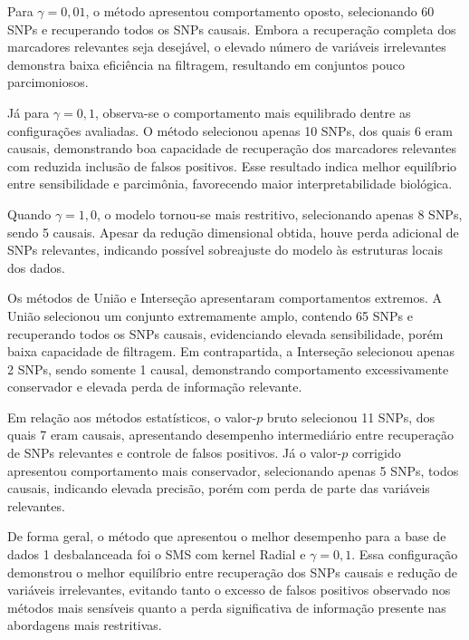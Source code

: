 \documentclass[
    12pt,
    a4paper,
    oneside,
    english,
    french,
    spanish,
    brazil
    ]{abntex2}
\begin{document}
Para $\gamma = 0{,}01$, o método apresentou comportamento oposto, selecionando 60 SNPs e recuperando todos os SNPs causais. Embora a recuperação completa dos marcadores relevantes seja desejável, o elevado número de variáveis irrelevantes demonstra baixa eficiência na filtragem, resultando em conjuntos pouco parcimoniosos.

Já para $\gamma = 0{,}1$, observa-se o comportamento mais equilibrado dentre as configurações avaliadas. O método selecionou apenas 10 SNPs, dos quais 6 eram causais, demonstrando boa capacidade de recuperação dos marcadores relevantes com reduzida inclusão de falsos positivos. Esse resultado indica melhor equilíbrio entre sensibilidade e parcimônia, favorecendo maior interpretabilidade biológica.

Quando $\gamma = 1{,}0$, o modelo tornou-se mais restritivo, selecionando apenas 8 SNPs, sendo 5 causais. Apesar da redução dimensional obtida, houve perda adicional de SNPs relevantes, indicando possível sobreajuste do modelo às estruturas locais dos dados.

Os métodos de União e Interseção apresentaram comportamentos extremos. A União selecionou um conjunto extremamente amplo, contendo 65 SNPs e recuperando todos os SNPs causais, evidenciando elevada sensibilidade, porém baixa capacidade de filtragem. Em contrapartida, a Interseção selecionou apenas 2 SNPs, sendo somente 1 causal, demonstrando comportamento excessivamente conservador e elevada perda de informação relevante.

Em relação aos métodos estatísticos, o valor-$p$ bruto selecionou 11 SNPs, dos quais 7 eram causais, apresentando desempenho intermediário entre recuperação de SNPs relevantes e controle de falsos positivos. Já o valor-$p$ corrigido apresentou comportamento mais conservador, selecionando apenas 5 SNPs, todos causais, indicando elevada precisão, porém com perda de parte das variáveis relevantes.

De forma geral, o método que apresentou o melhor desempenho para a base de dados 1 desbalanceada foi o SMS com kernel Radial e $\gamma = 0{,}1$. Essa configuração demonstrou o melhor equilíbrio entre recuperação dos SNPs causais e redução de variáveis irrelevantes, evitando tanto o excesso de falsos positivos observado nos métodos mais sensíveis quanto a perda significativa de informação presente nas abordagens mais restritivas.
\end{document}
